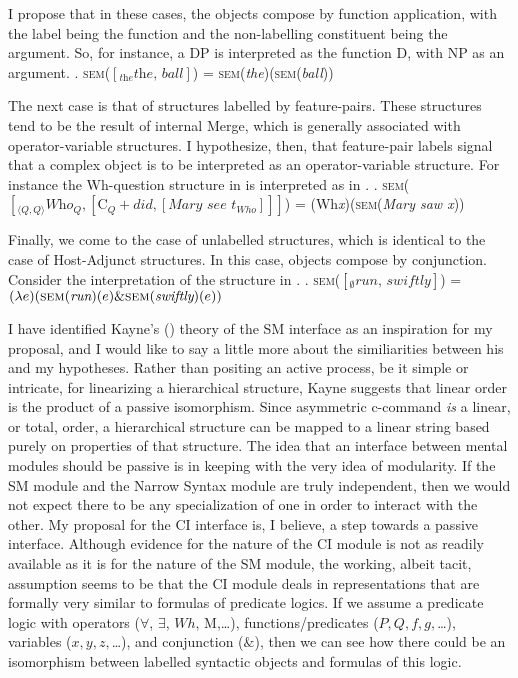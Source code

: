 \documentclass[MilwayThesis]{subfiles}
\begin{document}
I propose that in these cases, the objects compose by function application, with the label being the function and the non-labelling constituent being the argument.
So, for instance, a DP is interpreted as the function D, with NP as an argument.
\ex. \textsc{sem}($\left[_\textit{the} \textit{the, ball} \right]$) = \textsc{sem}(\textit{the})(\textsc{sem}(\textit{ball}))

The next case is that of structures labelled by feature-pairs.
These structures tend to be the result of internal Merge, which is generally associated with operator-variable structures.
I hypothesize, then, that feature-pair labels signal that a complex object is to be interpreted as an operator-variable structure.
For instance the Wh-question structure in \Next[a] is interpreted as in \Next[b].
\ex. \textsc{sem}($\left[_{\langle Q,Q \rangle} \textit{Who}_Q, \left[ \text{C}_Q+\textit{did}, \left[ \textit{Mary see } t_{Who} \right] \right]  \right]$) = (Wh\textit{x})(\textsc{sem}(\textit{Mary saw x}))

Finally, we come to the case of unlabelled structures, which is identical to the case of Host-Adjunct structures.
In this case, objects compose by conjunction.
Consider the interpretation of the structure in \Next.
\ex. \textsc{sem}($\left[_\emptyset \textit{run, swiftly} \right]$) =  $(\lambda e)(\textsc{sem}(\textit{run})(e) \& \textsc{sem}(\textit{swiftly})(e))$


I have identified Kayne's (\citeyear{kayne1994antisymmetry}) theory of the SM interface as an inspiration for my proposal, and I would like to say a little more about the similiarities between his and my hypotheses.
Rather than positing an active process, be it simple or intricate, for linearizing a hierarchical structure, Kayne suggests that linear order is the product of a passive isomorphism.
Since asymmetric c-command \textit{is} a linear, or total, order, a hierarchical structure can be mapped to a linear string based purely on properties of that structure.
The idea that an interface between mental modules should be passive is in keeping with the very idea of modularity.
If the SM module and the Narrow Syntax module are truly independent, then we would not expect there to be any specialization of one in order to interact with the other.
My proposal for the CI interface is, I believe, a step towards a passive interface.
Although evidence for the nature of the CI module is not as readily available as it is for the nature of the SM module, the working, albeit tacit, assumption seems to be that the CI module deals in representations that are formally very similar to formulas of predicate logics.
If we assume a predicate logic with operators ($\forall$, $\exists$, $Wh$, M,\ldots), functions/predicates ($P, Q, f, g,$\ldots), variables ($x, y, z,$\ldots), and conjunction ($\&$), then we can see how there could be an isomorphism between labelled syntactic objects and formulas of this logic.
\end{document}
